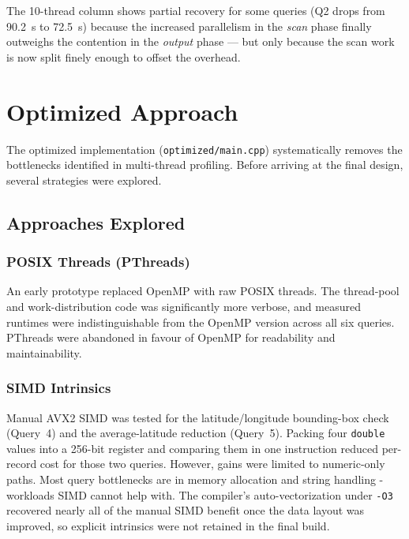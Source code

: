\documentclass[12pt]{article}
\begin{document}
\noindent
The 10-thread column shows partial recovery for some queries (Q2 drops from
90.2~s to 72.5~s) because the increased parallelism in the \emph{scan} phase
finally outweighs the contention in the \emph{output} phase --- but only
because the scan work is now split finely enough to offset the overhead.

\section{Optimized Approach}
\label{sec:opt}

The optimized implementation (\texttt{optimized/main.cpp}) systematically
removes the bottlenecks identified in multi-thread profiling. Before arriving
at the final design, several strategies were explored.

\subsection{Approaches Explored}

\subsubsection{POSIX Threads (PThreads)}

An early prototype replaced OpenMP with raw POSIX threads. The thread-pool
and work-distribution code was significantly more verbose, and measured
runtimes were indistinguishable from the OpenMP version across all six queries.
PThreads were abandoned in favour of OpenMP for readability and maintainability.

\subsubsection{SIMD Intrinsics}

Manual AVX2 SIMD was tested for the latitude/longitude bounding-box check
(Query~4) and the average-latitude reduction (Query~5). Packing four
\texttt{double} values into a 256-bit register and comparing them in one
instruction reduced per-record cost for those two queries. However, gains
were limited to numeric-only paths. Most query bottlenecks are in memory
allocation and string handling - workloads SIMD cannot help with. The
compiler's auto-vectorization under \texttt{-O3} recovered nearly all of the
manual SIMD benefit once the data layout was improved, so explicit intrinsics
were not retained in the final build.
\end{document}
